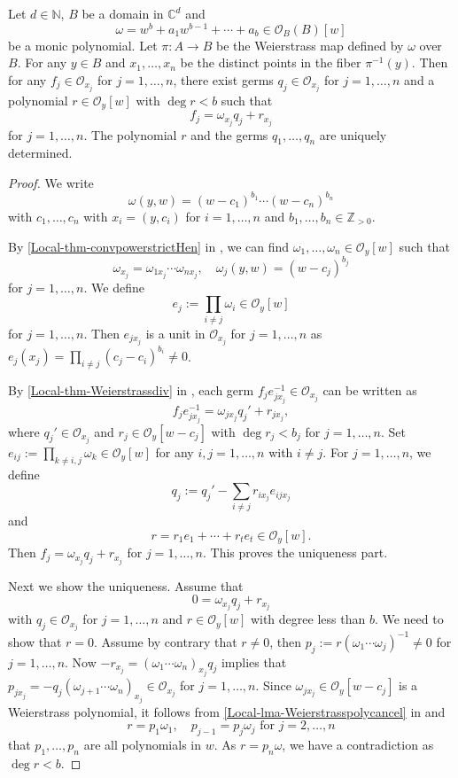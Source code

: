 \begin{lemma}\label{lma-Weidivgeneralized}
    Let $d\in \mathbb{N}$, $B$ be a domain in $\mathbb{C}^d$  and 
    \[
        \omega=w^b+ a_1 w^{b-1}+\cdots+a_b \in \mathcal{O}_B(B)[w]
    \] 
    be a monic polynomial. Let $\pi:A\rightarrow B$ be the Weierstrass map  defined by $\omega$ over $B$.
    For any $y\in B$ and $x_1,\ldots,x_n$ be the distinct points in the fiber $\pi^{-1}(y)$. Then for any $f_j\in \mathcal{O}_{x_j}$ for $j=1,\ldots,n$, there exist germs $q_j\in \mathcal{O}_{x_j}$  for $j=1,\ldots,n$ and a polynomial $r\in \mathcal{O}_y[w]$ with $\deg r<b$ such that 
    \[
        f_j=\omega_{x_j}q_j+r_{x_j}
    \]
    for $j=1,\ldots,n$. The polynomial $r$ and the germs $q_1,\ldots,q_n$ are uniquely determined.
\end{lemma}
\begin{proof}
    We write 
    \[
        \omega(y,w)=(w-c_1)^{b_1}\cdots (w-c_n)^{b_n}   
    \]
    with $c_1,\ldots,c_n$ with $x_i=(y,c_i)$ for $i=1,\ldots,n$ and $b_1,\ldots,b_n\in \mathbb{Z}_{>0}$.

    By \cref{Local-thm-convpowerstrictHen} in , we can find $\omega_1,\ldots,\omega_n\in \mathcal{O}_y[w]$ such that 
    \[
        \omega_{x_j}=\omega_{1x_j}\cdots\omega_{nx_j},\quad \omega_j(y,w)=(w-c_j)^{b_j}
    \]
    for $j=1,\ldots,n$. We define
    \[
        e_j:=\prod_{i\neq j}\omega_i\in \mathcal{O}_y[w]
    \]
    for $j=1,\ldots,n$. Then $e_{jx_j}$ is a unit in $\mathcal{O}_{x_j}$ for $j=1,\ldots,n$ as $e_j(x_j)=\prod_{i\neq j}(c_j-c_i)^{b_i}\neq 0$.

    By \cref{Local-thm-Weierstrassdiv} in , each germ $f_je_{jx_j}^{-1}\in \mathcal{O}_{x_j}$ can be written as
    \[
        f_je_{jx_j}^{-1}=\omega_{jx_j} q_j'+r_{jx_j},
    \]
    where $q_j'\in \mathcal{O}_{x_j}$ and $r_j\in \mathcal{O}_y[w-c_j]$ with $\deg r_j<b_j$ for $j=1,\ldots,n$.
    Set $e_{ij}:=\prod_{k\neq i,j}\omega_k\in \mathcal{O}_y[w]$ for any $i,j=1,\ldots,n$ with $i\neq j$.  For $j=1,\ldots,n$, we define
    \[
        q_j:=q_j'-\sum_{i\neq j} r_{ix_j}e_{ijx_{j}} 
    \]
    and
    \[
        r=r_1e_1+\cdots+r_te_t\in \mathcal{O}_y[w].
    \]
    Then $f_j=\omega_{x_j}q_j+r_{x_j}$ for $j=1,\ldots,n$. This proves the uniqueness part.

    Next we show the uniqueness. Assume that
    \[
        0=\omega_{x_j}q_j+r_{x_j}
    \]
    with $q_j\in \mathcal{O}_{x_j}$ for $j=1,\ldots,n$ and $r\in \mathcal{O}_y[w]$ with degree less than $b$. We need to show that $r=0$. Assume by contrary that $r\neq 0$, then $p_j:=r(\omega_1\cdots\omega_j)^{-1}\neq 0$ for $j=1,\ldots,n$. Now $-r_{x_j}=(\omega_1\cdots\omega_n)_{x_j}q_j$ implies that $p_{jx_j}=-q_j(\omega_{j+1}\cdots \omega_n)_{x_j}\in \mathcal{O}_{x_j}$ for $j=1,\ldots,n$. Since $\omega_{jx_j}\in \mathcal{O}_y[w-c_j]$ is a Weierstrass polynomial, it follows from \cref{Local-lma-Weierstrasspolycancel} in  and
    \[
        r=p_1\omega_1,\quad p_{j-1}=p_j\omega_j\text{ for }j=2,\ldots,n
    \]
    that $p_1,\ldots,p_n$ are all polynomials in $w$. As $r=p_n\omega$, we have a contradiction as $\deg r<b$.
\end{proof}


